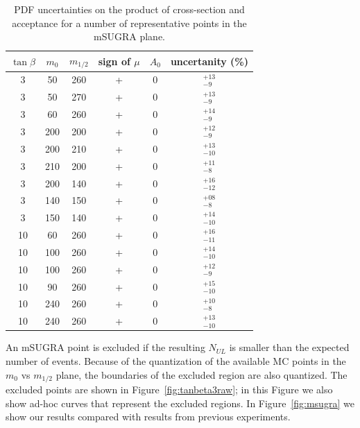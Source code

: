 \begin{table}[hbt]
\begin{center}
\caption{\label{tab:pdf} PDF uncertainties on the product of 
cross-section and acceptance for a number of representative points
in the mSUGRA plane.}
\begin{tabular}{c|c|c|c|c|c}
$\tan\beta$ & $m_0$ & $m_{1/2}$ & sign of $\mu$ & $A_0$ & uncertanity (\%)   \\ \hline
3           & 50    & 260       & +             &  0    & $^{+13}_{-9}$ \\
3           & 50    & 270       & +             &  0    & $^{+13}_{-9}$ \\
3           & 60    & 260       & +             &  0    & $^{+14}_{-9}$ \\
3           & 200   & 200       & +             &  0    & $^{+12}_{-9}$ \\
3           & 200   & 210       & +             &  0    & $^{+13}_{-10}$ \\
3           & 210   & 200       & +             &  0    & $^{+11}_{-8}$ \\
3           & 200   & 140       & +             &  0    & $^{+16}_{-12}$ \\
3           & 140   & 150       & +             &  0    & $^{+08}_{-8}$ \\
3           & 150   & 140       & +             &  0    & $^{+14}_{-10}$ \\
10          & 60    & 260       & +             &  0    & $^{+16}_{-11}$ \\
10          & 100   & 260       & +             &  0    & $^{+14}_{-10}$ \\
10          & 100   & 260       & +             &  0    & $^{+12}_{-9}$ \\
10          & 90    & 260       & +             &  0    & $^{+15}_{-10}$ \\
10          & 240   & 260       & +             &  0    & $^{+10}_{-8}$ \\
10          & 240   & 260       & +             &  0    & $^{+13}_{-10}$  \\ \hline
\end{tabular}
\end{center}
\end{table}


An mSUGRA point is excluded if the resulting $N_{UL}$ is smaller
than the expected number of events.  Because of the quantization 
of the available MC points in the $m_0$ vs $m_{1/2}$ plane, the 
boundaries of the excluded region are also quantized.  The excluded points 
are shown in Figure~\ref{fig:tanbeta3raw}; in this Figure we also show
ad-hoc curves that represent the excluded regions.
In Figure~\ref{fig:msugra} we show our results compared with
results from previous experiments.


